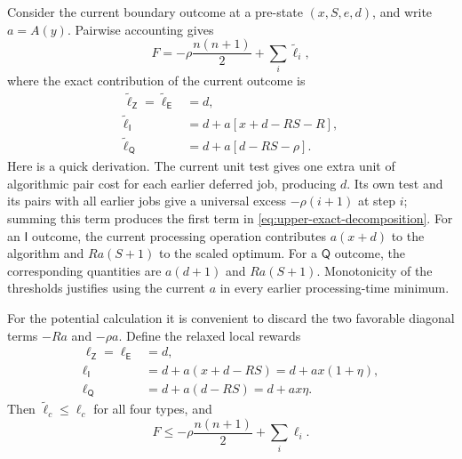 Consider the current boundary outcome at a pre-state $(x,S,e,d)$, and write
$a=A(y)$.  Pairwise accounting gives
\begin{equation}
\label{eq:upper-exact-decomposition}
 F=-\rho\frac{n(n+1)}2+\sum_i\widetilde\ell_i,
\end{equation}
where the exact contribution of the current outcome is
\begin{align}
 \widetilde\ell_{\mathsf Z}
 =\widetilde\ell_{\mathsf E}&=d,\label{eq:upper-exact-ZE}\\
 \widetilde\ell_{\mathsf I}
 &=d+a[x+d-RS-R],\label{eq:upper-exact-I}\\
 \widetilde\ell_{\mathsf Q}
 &=d+a[d-RS-\rho].\label{eq:upper-exact-Q}
\end{align}
Here is a quick derivation.  The current unit test gives one extra unit of
algorithmic pair cost for each earlier deferred job, producing $d$.  Its own
test and its pairs with all earlier jobs give a universal excess
$-\rho(i+1)$ at step $i$; summing this term produces the first term in
\eqref{eq:upper-exact-decomposition}.  For an $\mathsf I$ outcome, the
current processing operation contributes $a(x+d)$ to the algorithm and
$Ra(S+1)$ to the scaled optimum.  For a $\mathsf Q$ outcome, the corresponding
quantities are $a(d+1)$ and $Ra(S+1)$.  Monotonicity of the thresholds justifies
using the current $a$ in every earlier processing-time minimum.

For the potential calculation it is convenient to discard the two favorable
diagonal terms $-Ra$ and $-\rho a$.  Define the relaxed local rewards
\begin{align}
 \ell_{\mathsf Z}=\ell_{\mathsf E}&=d,\label{eq:upper-ell-ZE}\\
 \ell_{\mathsf I}&=d+a(x+d-RS)
                  =d+ax(1+\eta),\label{eq:upper-ell-I}\\
 \ell_{\mathsf Q}&=d+a(d-RS)
                  =d+ax\eta.\label{eq:upper-ell-Q}
\end{align}
Then $\widetilde\ell_c\le\ell_c$ for all four types, and
\begin{equation}
\label{eq:upper-F-relaxed}
 F\le-\rho\frac{n(n+1)}2+\sum_i\ell_i.
\end{equation}

